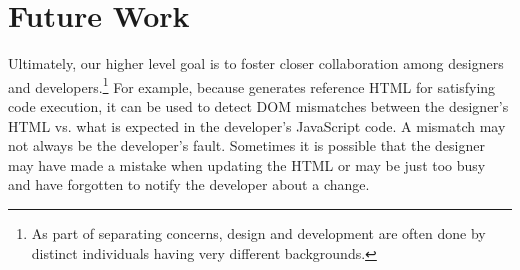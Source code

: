 \section{Future Work}
Ultimately, our higher level goal is to foster closer collaboration among designers and developers.\footnote{As part of separating concerns, design and development are often done by distinct individuals having very different backgrounds.}
For example, because \tool generates reference HTML for satisfying code execution, it can be used to detect DOM mismatches between the designer's HTML vs. what is expected in the developer's JavaScript code.
A mismatch may not always be the developer's fault.  Sometimes it is possible that the designer may have made a mistake when updating the HTML or may be just too busy and have forgotten to notify the developer about a change.
